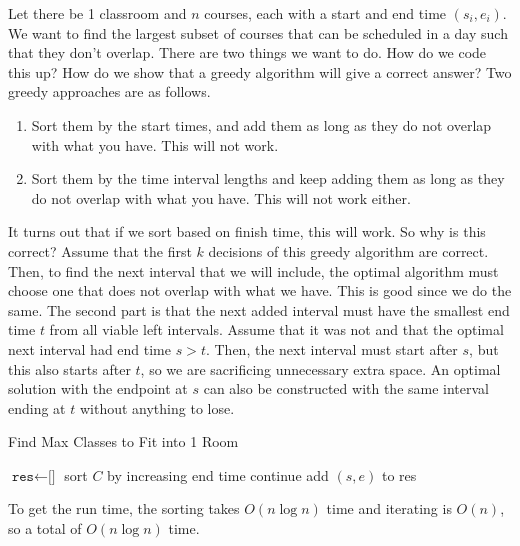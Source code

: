 \documentclass{article}
\begin{document}
  \begin{example}
    Let there be 1 classroom and $n$ courses, each with a start and end time $(s_i, e_i)$. We want to find the largest subset of courses that can be scheduled in a day such that they don't overlap. There are two things we want to do. How do we code this up? How do we show that a greedy algorithm will give a correct answer? Two greedy approaches are as follows. 
    \begin{enumerate}
      \item Sort them by the start times, and add them as long as they do not overlap with what you have. This will not work. 
      \item Sort them by the time interval lengths and keep adding them as long as they do not overlap with what you have. This will not work either. 
    \end{enumerate}
    It turns out that if we sort based on finish time, this will work. So why is this correct? Assume that the first $k$ decisions of this greedy algorithm are correct. Then, to find the next interval that we will include, the optimal algorithm must choose one that does not overlap with what we have. This is good since we do the same. The second part is that the next added interval must have the smallest end time $t$ from all viable left intervals. Assume that it was not and that the optimal next interval had end time $s > t$. Then, the next interval must start after $s$, but this also starts after $t$, so we are sacrificing unnecessary extra space. An optimal solution with the endpoint at $s$ can also be constructed with the same interval ending at $t$ without anything to lose. 

    \begin{algorithm}[H]
      \caption{Find Max Classes to Fit into 1 Room}
      \label{alg:class1}
      \begin{algorithmic}
          \State $\texttt{res} \gets \texttt{[]}$ 
          \State sort $C$ by increasing end time
             
              \State continue
            \EndIf
            \State add $(s, e)$ to res 
          \EndFor
          \State {}
        \EndFunction
      \end{algorithmic}
    \end{algorithm}
    To get the run time, the sorting takes $O(n \log{n})$ time and iterating is $O(n)$, so a total of $O(n \log{n})$ time. 
  \end{example}
\end{document}
